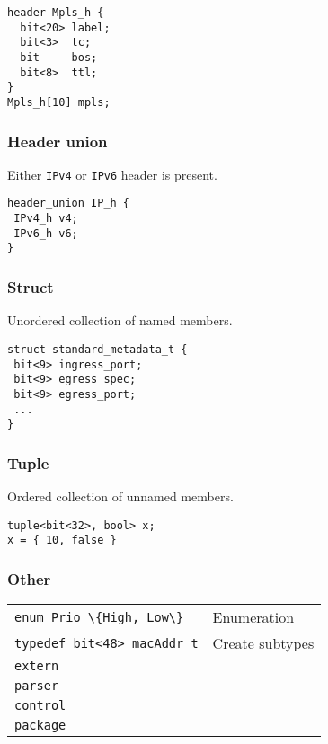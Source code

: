 \documentclass[a4paper, fontsize=8pt, landscape, DIV=1]{scrartcl}
\begin{document}
\begin{multicols*}{3}
\begin{lstlisting}[style=P4style]
header Mpls_h {
  bit<20> label;
  bit<3>  tc;
  bit     bos;
  bit<8>  ttl;
}
Mpls_h[10] mpls;
\end{lstlisting}

  \subsubsection{Header union}
Either \texttt{IPv4} or \texttt{IPv6} header is present.

\begin{lstlisting}[style=P4style]
header_union IP_h {
 IPv4_h v4;
 IPv6_h v6;
}
\end{lstlisting}


  \subsubsection{Struct}
  Unordered collection of named members.

\begin{lstlisting}[style=P4style]
struct standard_metadata_t {
 bit<9> ingress_port;
 bit<9> egress_spec;
 bit<9> egress_port;
 ...
}
\end{lstlisting}

  \subsubsection{Tuple}
  Ordered collection of unnamed members.

\begin{lstlisting}[style=P4style]
tuple<bit<32>, bool> x;
x = { 10, false }
\end{lstlisting}

  \subsubsection{Other}
  \begin{tabularx}{\linewidth}{ l X}
  \lstinline[style=P4style]!enum Prio \{High, Low\}! &
  Enumeration \\
  \lstinline[style=P4style]!typedef bit<48> macAddr_t! &
  Create subtypes \\
  \lstinline[style=P4style]!extern! &
  {}  \\
  \lstinline[style=P4style]!parser! &
  {}  \\
  \lstinline[style=P4style]!control! &
  {}  \\
  \lstinline[style=P4style]!package! &
  {}  \\
  \end{tabularx}


\end{multicols*}
\end{document}
